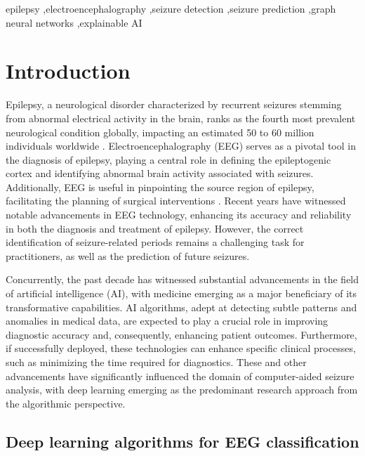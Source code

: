 \documentclass[a4paper,fleqn]{cas-sc}
\begin{document}
\begin{keywords}
epilepsy \sep electroencephalography \sep seizure detection \sep seizure prediction \sep graph neural networks  \sep explainable AI
\end{keywords}

\maketitle

\section{Introduction}
Epilepsy, a neurological disorder characterized by recurrent seizures stemming from abnormal electrical activity in the brain, ranks as the fourth most prevalent neurological condition globally, impacting an estimated 50 to 60 million individuals worldwide \cite{PeruccaEpilepsyWorldwide,ThurmanEpilepsyWorldwide}. Electroencephalography (EEG) serves as a pivotal tool in the diagnosis of epilepsy, playing a central role in defining the epileptogenic cortex and identifying abnormal brain activity associated with seizures. Additionally, EEG is useful in pinpointing the source region of epilepsy, facilitating the planning of surgical interventions \cite{JehiEpilepticZone}. Recent years have witnessed notable advancements in EEG technology, enhancing its accuracy and reliability in both the diagnosis and treatment of epilepsy. However, the correct identification of seizure-related periods remains a challenging task for practitioners, as well as the prediction of future seizures.

Concurrently, the past decade has witnessed substantial advancements in the field of artificial intelligence (AI), with medicine emerging as a major beneficiary of its transformative capabilities. AI algorithms, adept at detecting subtle patterns and anomalies in medical data, are expected to play a crucial role in improving diagnostic accuracy and, consequently, enhancing patient outcomes. Furthermore, if successfully deployed, these technologies can enhance specific clinical processes, such as minimizing the time required for diagnostics. These and other advancements have significantly influenced the domain of computer-aided seizure analysis, with deep learning emerging as the predominant research approach from the algorithmic perspective. 

\subsection{Deep learning algorithms for EEG classification}
\end{document}
